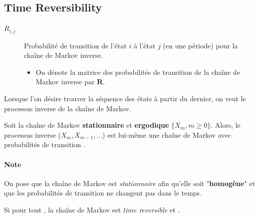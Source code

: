 \documentclass[10pt, french]{article}
\begin{document}
\begin{multicols*}{2}
\columnbreak
\subsection{Time Reversibility}
\begin{distributions}[Notation]
\begin{description}
	\item[$R_{i, j}$]	Probabilité de transition de l'état $i$ à l'état $j$ (en une période) pour la chaîne de Markov inverse.
		\begin{itemize}
		\item	On dénote la matrice des probabilités de transition de la chaîne de Markov inverse par $\bm{R}$.
		\end{itemize}
\end{description}
\end{distributions}

\begin{rappel_enhanced}[Contexte]
Lorsque l'on désire trouver la séquence des états à partir du dernier, on veut le processus inverse de la chaîne de Markov.
\end{rappel_enhanced}

\begin{definitionNOHFILL}
Soit la chaîne de Markov \textbf{stationnaire} et \textbf{ergodique} $\{X_{m}, m \geq 0\}$. Alors, le processus inverse ($X_{m}, X_{m - 1}, \dots$) est lui-même une chaîne de Markov avec probabilités de transition .

\paragraph{Note}	On pose que la chaîne de Markov est \textit{stationnaire} afin qu'elle soit "\textbf{homogène}" et que les probabilités de transition ne changent pas dans le temps.
\end{definitionNOHFILL}


\begin{definitionNOHFILLsub}
Si  pour tout , la chaîne de Markov est \og \textit{time reversible} \fg{} et .\\


\end{definitionNOHFILLsub}
\end{multicols*}
\end{document}
